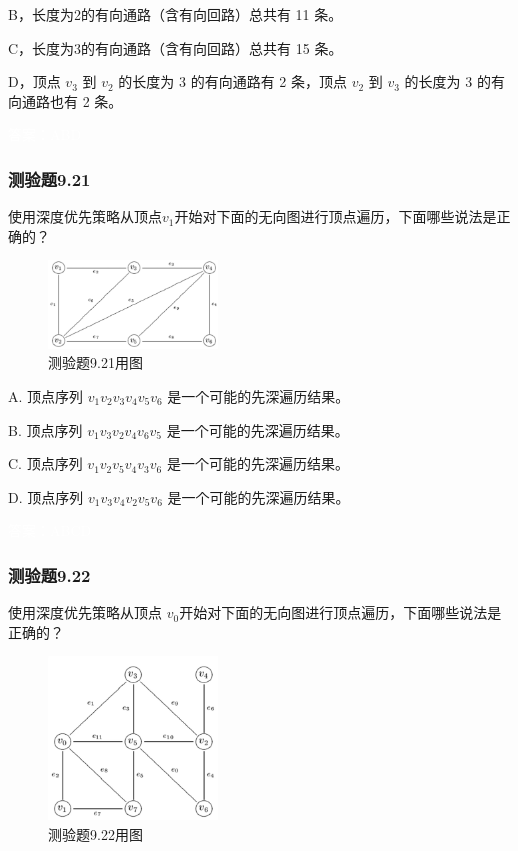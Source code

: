 \documentclass[UTF8, heading=true]{ctexart}
\begin{document}
B，长度为2的有向通路（含有向回路）总共有 11 条。

C，长度为3的有向通路（含有向回路）总共有 15 条。

D，顶点 $v_3$ 到 $v_2$ 的长度为 3 的有向通路有 2 条，顶点 $v_2$ 到 $v_3$ 的长度为 3 的有向通路也有 2 条。

\textcolor{white}{答案：ABD}

\subsubsection{测验题9.21}

使用深度优先策略从顶点$v_1$开始对下面的无向图进行顶点遍历，下面哪些说法是正确的？

\begin{figure}[H]
  \centering
  \includegraphics[width=0.4\textwidth]{9.21.jpg} %
  \caption{测验题9.21用图}
\end{figure}

A. 顶点序列 $v_1 v_2 v_3 v_4 v_5 v_6$ 是一个可能的先深遍历结果。

B. 顶点序列 $v_1 v_3 v_2 v_4 v_6 v_5$ 是一个可能的先深遍历结果。

C. 顶点序列 $v_1 v_2 v_5 v_4 v_3 v_6$ 是一个可能的先深遍历结果。

D.  顶点序列 $v_1 v_3 v_4 v_2 v_5 v_6$ 是一个可能的先深遍历结果。

\textcolor{white}{答案：ABCD}

\subsubsection{测验题9.22}

使用深度优先策略从顶点
$v_0$开始对下面的无向图进行顶点遍历，下面哪些说法是正确的？

\begin{figure}[H]
  \centering
  \includegraphics[width=0.4\textwidth]{9.22.jpg} %
  \caption{测验题9.22用图}
\end{figure}
\end{document}
